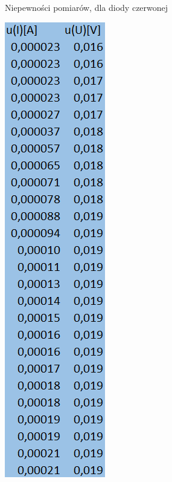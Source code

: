\documentclass{article}
\begin{document}
\begin{figure}[b!]
\begin{subfigure}[b]{0.15\textwidth}
     \caption{Niepewności pomiarów, dla diody czerwonej}
  \end{subfigure}
  \begin{subfigure}[b]{0.15\textwidth}
    \includegraphics[width=\linewidth]{Niepewnosci_Dioda_Niebieskia.png}

\end{subfigure}
\end{figure}
\end{document}
